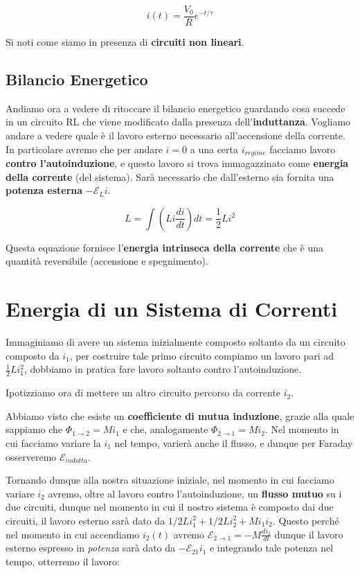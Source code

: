 $$
i(t) = \frac{V_0}{R} e^{-t/\tau}
$$

Si noti come siamo in presenza di \textbf{circuiti non lineari}.

\subsection{Bilancio Energetico}
Andiamo ora a vedere di ritoccare il bilancio energetico guardando cosa succede in un circuito RL che viene modificato dalla presenza dell'\textbf{induttanza}. 
Vogliamo andare a vedere quale è il lavoro esterno necessario all'accensione della corrente. In particolare avremo che per andare $i=0$ a una certa $i_{regime}$ facciamo lavoro \textbf{contro l'autoinduzione}, e questo lavoro si trova immagazzinato come \textbf{energia della corrente} (del sistema). Sarà necessario che dall'esterno sia fornita una \textbf{potenza esterna} $-\mathcal{E}_L i$.

\begin{large}
	\begin{equation}
		L = \int\left(Li\frac{di}{dt}\right) dt = \frac{1}{2} Li^2
	\end{equation}
\end{large}

Questa equazione fornisce l'\textbf{energia intrinseca della corrente} che è una quantità reversibile (accensione e spegnimento).

\section{Energia di un Sistema di Correnti}
Immaginiamo di avere un sistema inizialmente composto soltanto da un circuito composto da $i_1$, per costruire tale primo circuito compiamo un lavoro pari ad $\frac{1}{2}Li_1^2$, dobbiamo in pratica fare lavoro soltanto contro l'autoinduzione. 

Ipotizziamo ora di mettere un altro circuito percorso da corrente $i_2$.

Abbiamo visto che esiste un \textbf{coefficiente di mutua induzione}, grazie alla quale sappiamo che $\Phi_{1\rightarrow2} = Mi_1$ e che, analogamente $\Phi_{2\rightarrow1} = Mi_2$. Nel momento in cui facciamo variare la $i_1$ nel tempo, varierà anche il flusso, e dunque per Faraday osserveremo $\mathcal{E}_{indotta}$.

Tornando dunque alla nostra situazione iniziale, nel momento in cui facciamo variare $i_2$ avremo, oltre al lavoro contro l'autoinduzione, un \textbf{flusso mutuo} su i due circuiti, dunque nel momento in cui il nostro sistema è composto dai due circuiti, il lavoro esterno sarà dato da $1/2 Li_1^2 + 1/2Li_2^2 + Mi_1i_2$. Questo perché nel momento in cui accendiamo $i_2(t)$ avremo $\mathcal{E}_{2\rightarrow1} = -M\frac{di_2}{dt}$ dunque il lavoro esterno espresso in \textit{potenza} sarà dato da $-\mathcal{E}_{21}i_1$ e integrando tale potenza nel tempo, otterremo il lavoro: 

